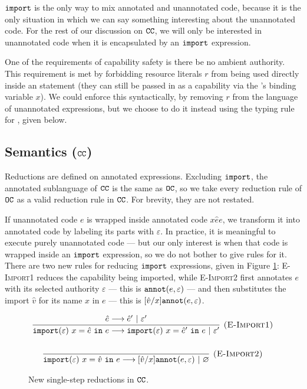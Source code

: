 $\mathtt{import}$ is the only way to mix annotated and unannotated code, because it is the only situation in which we can say something interesting about the unannotated code. For the rest of our discussion on $\mathtt{CC}$, we will only be interested in unannotated code when it is encapsulated by an $\mathtt{import}$ expression.

One of the requirements of capability safety is there be no ambient authority.
This requirement is met by forbidding resource literals $r$ from being used directly inside an  statement (they can still be passed in as a capability via the 's binding variable $x$).
We could enforce this syntactically, by removing $r$ from the language of unannotated expressions, but we choose to do it instead using the typing rule for , given below.

\subsection{Semantics ($\mathtt{CC}$)}

Reductions are defined on annotated expressions. Excluding $\mathtt{import}$, the annotated sublanguage of $\mathtt{CC}$ is the same as $\mathtt{OC}$, so we take every reduction rule of $\mathtt{OC}$ as a valid reduction rule in $\mathtt{CC}$. For brevity, they are not restated.

If unannotated code $e$ is wrapped inside annotated code ${x}{\hat e}{e}$, we transform it into annotated code by labeling its parts with $\varepsilon$. In practice, it is meaningful to execute purely unannotated code --- but our only interest is when that code is wrapped inside an $\mathtt{import}$ expression, so we do not bother to give rules for it. There are two new rules for reducing $\mathtt{import}$ expressions, given in Figure \ref{fig:epscalc_reductions}: \textsc{E-Import1} reduces the capability being imported, while \textsc{E-Import2} first annotates $e$ with its selected authority $\varepsilon$ --- this is $\mathtt{annot}(e, \varepsilon)$ --- and then substitutes the import $\hat v$ for its name $x$ in $e$ --- this is $[\hat v/x]\mathtt{annot}(e, \varepsilon)$.

\begin{figure}[h]


\[
\begin{array}{c}
\infer[\textsc{(E-Import1)}]
	{\kwa{import}(\varepsilon)~x = \hat e~\kw{in} e \longrightarrow \kwa{import}(\varepsilon)~x = \hat e'~\kw{in} e~|~\varepsilon'}
	{\hat e \longrightarrow \hat e'~|~\varepsilon'}\\[4ex]

\infer[\textsc{(E-Import2)}]
	{\kwa{import}(\varepsilon)~x = \hat v~\kw{in} e \longrightarrow [\hat v/x]\kwa{annot}(e, \varepsilon)~|~\varnothing}
	{}

\end{array}
\]


\vspace{-7pt}
\caption{New single-step reductions in $\mathtt{CC}$.}
\label{fig:epscalc_reductions}
\end{figure}

